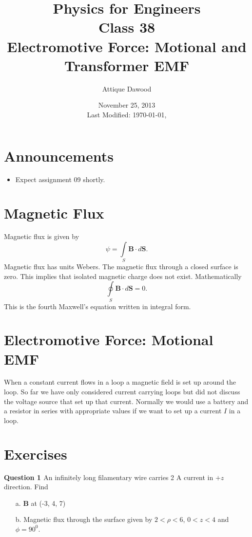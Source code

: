 \documentclass[12pt,a4paper]{article}
\title{\vspace{-3cm}Physics for Engineers\\Class 38\\Electromotive Force: Motional and Transformer EMF}
\author{Attique Dawood}
\date{November 25, 2013\\[0.2cm] Last Modified: \today, \currenttime}
\begin{document}
\maketitle
\section{Announcements}
\begin{itemize}
\item Expect assignment 09 shortly.
\end{itemize}
\section{Magnetic Flux}
Magnetic flux is given by
\begin{equation}
\psi=\int\limits_{S}\textbf{B}\cdot d{\textbf{S}}.
\end{equation}
Magnetic flux has units Webers. The magnetic flux through a closed surface is zero. This implies that isolated magnetic charge does not exist. Mathematically
\begin{equation}
\oint\limits_{S}\textbf{B}\cdot d{\textbf{S}}=0.
\end{equation}
This is the fourth Maxwell's equation written in integral form.
\section{Electromotive Force: Motional EMF}
When a constant current flows in a loop a magnetic field is set up around the loop. So far we have only considered current carrying loops but did not discuss the voltage source that set up that current. Normally we would use a battery and a resistor in series with appropriate values if we want to set up a current $I$ in a loop.
\section{Exercises}
\noindent\textbf{Question 1 \cite[Problem 7.21, page 300]{Sadiku}} An infinitely long filamentary wire carries 2 A current in $+z$ direction. Find
\begin{itemize}
\item[a.] \textbf{B} at (-3, 4, 7)
\item[b.] Magnetic flux through the surface given by $2<\rho<6$, $0<z<4$ and $\phi=90^0$.
\end{itemize}


\end{document}
